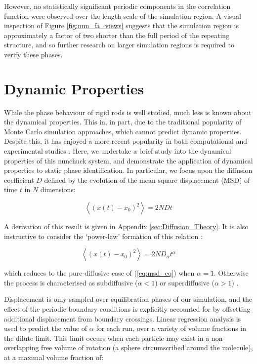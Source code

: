 \documentclass[11pt, a4paper]{article} %
\begin{document}
However, no statistically significant periodic components in the correlation function were observed over the length scale of the simulation region. A visual inspection of Figure \ref{fig:nun_fa_views} suggests that the simulation region is approximately a factor of two shorter than the full period of the repeating structure, and so further research on larger simulation regions is required to verify these phases.




\section{Dynamic Properties} \label{sec:Dynamics}
While the phase behaviour of rigid rods is well studied, much less is known about the dynamical properties. This in, in part, due to the traditional popularity of Monte Carlo simulation approaches, which cannot predict dynamic properties. Despite this, it has enjoyed a more recent popularity in both computational and experimental studies \cite{GayBalmaz2013, Zhao2013, Rey2013}. Here, we undertake a brief study into the dynamical properties of this nunchuck system, and demonstrate the application of dynamical properties to static phase identification. In particular, we focus upon the diffusion coefficient $D$ defined by the evolution of the mean square displacement (MSD) of time $t$ in $N$ dimensions:

\begin{equation} \label{eq:msd_eq} 
\left\langle \left(x(t) - x_{0}\right)^{2} \right\rangle = 2NDt
\end{equation}

A derivation of this result is given in Appendix \ref{sec:Diffusion_Theory}. It is also instructive to consider the `power-law' formation of this relation \cite{Ernst2013}: 

\begin{equation}
\left\langle \left(x(t) - x_{0}\right)^{2} \right\rangle = 2ND_{\alpha}t^{\alpha}
\end{equation}

which reduces to the pure-diffusive case of (\ref{eq:msd_eq}) when $\alpha=1$. Otherwise the process is characterised as subdiffusive ($\alpha < 1$) or superdiffusive ($\alpha > 1$) \cite{Metzler2000}. 

Displacement is only sampled over equilibration phases of our simulation, and the effect of the periodic boundary conditions is explicitly accounted for by offsetting additional displacement from boundary crossings. Linear regression analysis is used to predict the value of $\alpha$ for each run, over a variety of volume fractions in the dilute limit. This limit occurs when each particle may exist in a non-overlapping free volume of rotation (a sphere circumscribed around the molecule), at a maximal volume fraction of:
\end{document}
